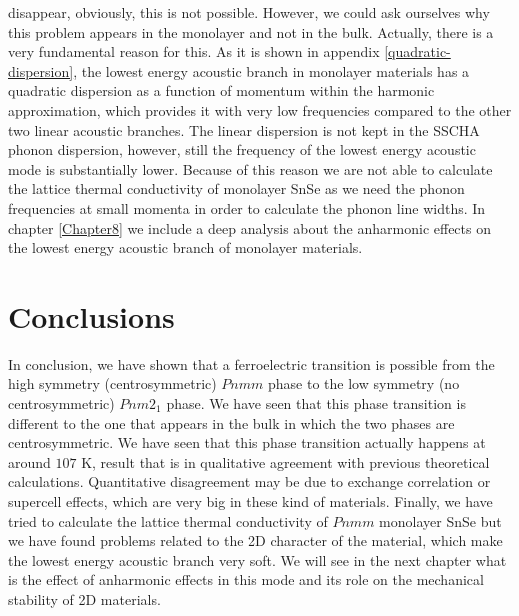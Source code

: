 disappear, obviously, this is not possible. However, we could ask ourselves why this problem appears in the monolayer 
and not in the bulk. Actually, there is a very fundamental reason for this. As it 
is shown in appendix \ref{quadratic-dispersion}, the lowest energy acoustic branch in monolayer materials has a 
quadratic dispersion as a function of momentum within the harmonic approximation, which provides it with very low 
frequencies compared to the other two linear acoustic branches. The linear dispersion is not kept in the SSCHA phonon
dispersion, however, still the frequency of the lowest energy acoustic mode is substantially lower. Because of this 
reason we are not able to calculate the lattice thermal conductivity of monolayer SnSe as we need the phonon 
frequencies at small momenta in order to calculate the phonon line widths. In chapter \ref{Chapter8} we include a 
deep analysis about the anharmonic effects on the lowest energy acoustic branch of monolayer materials.

\section{Conclusions}

In conclusion, we have shown that a ferroelectric transition is possible from the high symmetry (centrosymmetric) 
$Pnmm$ phase to the low symmetry (no centrosymmetric) $Pnm2_{1}$ phase. We have seen that this phase transition 
is different to the one that appears in the bulk in which the two phases are centrosymmetric. We have seen that 
this phase transition actually happens at around $107$ K, result that is in qualitative agreement with previous 
theoretical calculations. Quantitative disagreement may be due to exchange correlation or supercell effects, which 
are very big in these kind of materials. Finally, we have tried to calculate the lattice thermal conductivity of 
$Pnmm$ monolayer SnSe but we have found problems related to the 2D character of the material, which make the lowest 
energy acoustic branch very soft. We will see in the next chapter what is the effect of anharmonic effects in this 
mode and its role on the mechanical stability of 2D materials.
